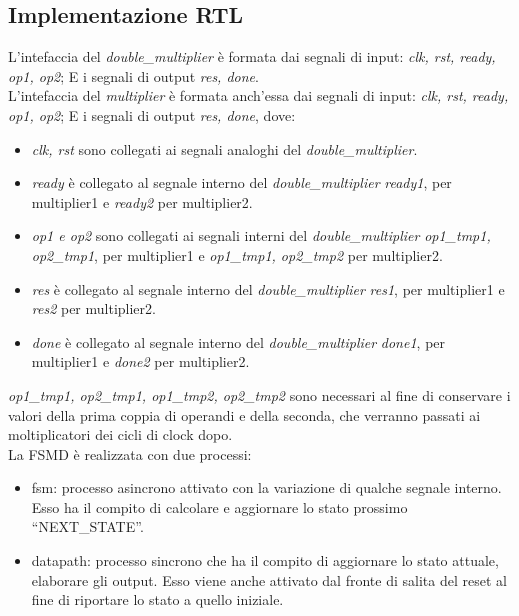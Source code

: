 \documentclass[]{IEEEtran}
\begin{document}
\subsection{Implementazione RTL}
L'intefaccia del {\it double\_multiplier} è formata dai segnali di input: {\it clk, rst, ready, op1, op2}; E i segnali di output {\it res, done}. \\
L'intefaccia del {\it multiplier} è formata anch'essa dai segnali di input: {\it clk, rst, ready, op1, op2}; E i segnali di output {\it res, done}, dove:
\begin{itemize}
    \item {\it clk, rst} sono collegati ai segnali analoghi del {\it double\_multiplier}.
    \item {\it ready} è collegato al segnale interno del {\it double\_multiplier} {\it ready1}, per multiplier1 e {\it ready2} per multiplier2.
    \item {\it op1 e op2} sono collegati ai segnali interni del {\it double\_multiplier} {\it op1\_tmp1, op2\_tmp1}, per multiplier1 e {\it op1\_tmp1, op2\_tmp2} per multiplier2.
    \item {\it res} è collegato al segnale interno del {\it double\_multiplier} {\it res1}, per multiplier1 e {\it res2} per multiplier2.
    \item {\it done} è collegato al segnale interno del {\it double\_multiplier} {\it done1}, per multiplier1 e {\it done2} per multiplier2.
\end{itemize}
{\it op1\_tmp1, op2\_tmp1, op1\_tmp2, op2\_tmp2} sono necessari al fine di conservare i valori della prima coppia di operandi e della seconda, che verranno passati ai moltiplicatori dei cicli di clock dopo. \\
La FSMD è realizzata con due processi:
\begin{itemize}
    \item fsm: processo asincrono attivato con la variazione di qualche segnale interno. Esso ha il compito di calcolare e aggiornare lo stato prossimo ``NEXT\_STATE''.
    \item datapath: processo sincrono che ha il compito di aggiornare lo stato attuale, elaborare gli output. Esso viene anche attivato dal fronte di salita del reset al fine di riportare lo stato a quello iniziale.
\end{itemize}
\end{document}
